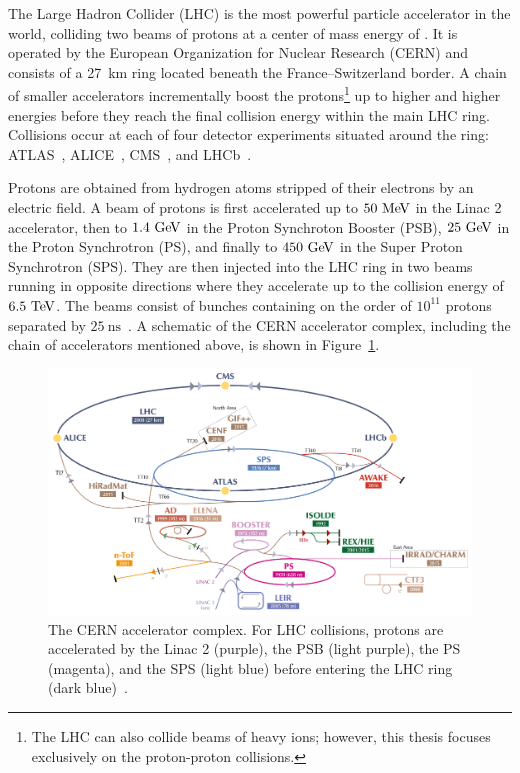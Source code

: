﻿The Large Hadron Collider (LHC) \cite{2008.LHC} is the most powerful particle accelerator in the world, colliding two beams of protons at a center of mass energy of .
It is operated by the European Organization for Nuclear Research (CERN) and consists of a 27~km ring located beneath the France--Switzerland border.
A chain of smaller accelerators incrementally boost the protons\footnote{The LHC can also collide beams of heavy ions; however, this thesis focuses exclusively on the proton-proton collisions.} up to higher and higher energies before they reach the final collision energy within the main LHC ring.
Collisions occur at each of four detector experiments situated around the ring: ATLAS~\cite{PERF-2007-01}, ALICE~\cite{2008.alice}, CMS~\cite{2008.cms}, and LHCb~\cite{2008.lhcb}.

Protons are obtained from hydrogen atoms stripped of their electrons by an electric field.
A beam of protons is first accelerated up to $50\mev$ in the Linac 2 accelerator, then to $1.4\gev$ in the Proton Synchroton Booster (PSB), $25\gev$ in the Proton Synchrotron (PS), and finally to $450\gev$ in the Super Proton Synchrotron (SPS).
They are then injected into the LHC ring in two beams running in opposite directions where they accelerate up to the collision energy of $6.5\tev$.
The beams consist of bunches containing on the order of $10^{11}$ protons separated by $25~\textrm{ns}$~\cite{2019.accelerator-complex}.
A schematic of the CERN accelerator complex, including the chain of accelerators mentioned above, is shown in Figure~\ref{fig:detector_accelerator_complex}.

\begin{figure}
  \centering
  \includegraphics[width=.9\textwidth]{figs/detector/accelerator-complex-small}
  \caption[The CERN accelerator complex.  For LHC collisions, protons are accelerated by the Linac 2 (purple), the PSB (light purple), the PS (magenta), and the SPS (light blue) before entering the LHC ring (dark blue).]{The CERN accelerator complex.  For LHC collisions, protons are accelerated by the Linac 2 (purple), the PSB (light purple), the PS (magenta), and the SPS (light blue) before entering the LHC ring (dark blue)~\cite{2016.accelerator-image}.}
  \label{fig:detector_accelerator_complex}
\end{figure}

